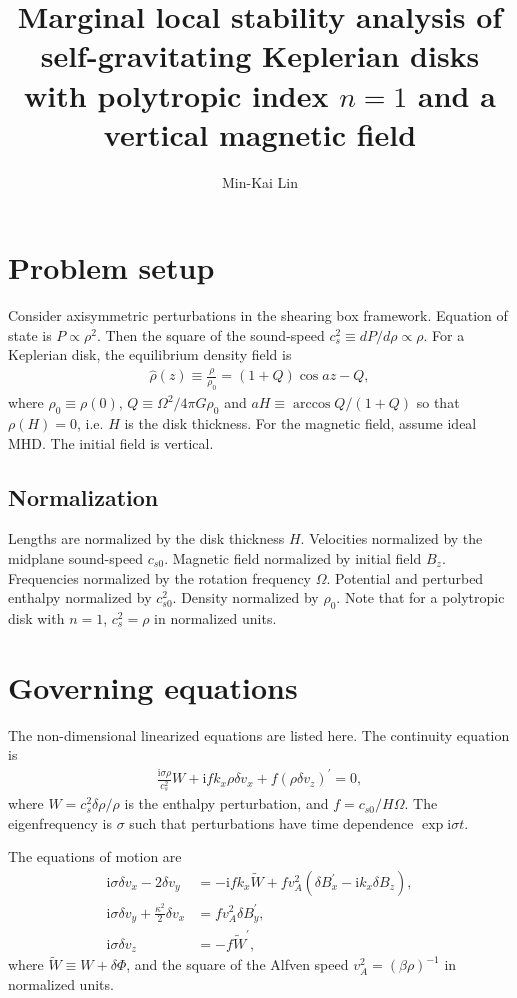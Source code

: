 \documentclass[12pt,preprint]{aastex}
\newcommand{\imgi}{\mathrm{i}}
\newcommand{\dd}{\delta}
\newcommand{\dvx}{\dd v_x}
\newcommand{\dvy}{\dd v_y}
\newcommand{\dvz}{\dd v_z}
\newcommand{\dbx}{\dd B_x}
\newcommand{\dby}{\dd B_y}
\newcommand{\dbz}{\dd B_z}
\newcommand{\w}{ \widetilde{W}}
\begin{document}
\title{Marginal local stability analysis of self-gravitating Keplerian
  disks with polytropic index $n=1$ and a vertical magnetic field}   


\author{Min-Kai Lin}

\section{Problem setup}
Consider axisymmetric perturbations in the shearing box
framework. Equation of state is $P\propto \rho^2$. Then the 
square of the sound-speed $c_s^2\equiv dP/d\rho \propto \rho$. For a
Keplerian disk, the equilibrium density field is
\begin{align}
\hat{\rho}(z)\equiv \frac{\rho}{\rho_0} = (1+Q)\cos{az} - Q, 
\end{align}
where $\rho_0\equiv\rho(0)$, $Q\equiv \Omega^2 / 4\pi G\rho_0$ and
$aH\equiv \arccos{Q/(1+Q)}$ so that $\rho(H) = 0$, i.e. $H$ is the
disk thickness. For the magnetic field, assume ideal 
MHD. The initial field is vertical.      

\subsection{Normalization}
Lengths are normalized by the disk thickness $H$. Velocities
normalized by the midplane sound-speed $c_{s0}$. Magnetic field
normalized by initial field $B_z$. Frequencies normalized by the
rotation frequency $\Omega$. Potential and perturbed enthalpy normalized by
$c_{s0}^2$. Density normalized by $\rho_0$. Note that for a polytropic
disk with $n=1$, $c_s^2=\rho$ in normalized 
units.  


\section{Governing equations}
The non-dimensional linearized equations are listed here. The
continuity equation is 
\begin{align}
  \frac{\imgi\sigma\rho}{c_s^2}W + \imgi  f k_x \rho \dvx +
  f\left(\rho\dvz\right)^\prime = 0, \label{cont}   
\end{align}
where $W = c_s^2\delta\rho/\rho$ is the enthalpy perturbation, and 
$f= c_{s0}/H\Omega$. The eigenfrequency is $\sigma$ such that
perturbations have time dependence $\exp{\imgi\sigma t}$. 


The equations of motion are
\begin{align}
  \imgi\sigma \dvx - 2 \dvy  &= - \imgi
  f k_x\w + fv_A^2 \left(\dbx^\prime - \imgi 
  k_x\dbz\right),\\
  \imgi\sigma\dvy + 
  \frac{\kappa^2}{2}\dvx &= fv_A^2\dby^\prime\label{lin_vy},\\ 
  \imgi\sigma\dvz & = -f \w^\prime\label{lin_vz}, 
\end{align}
where $\w \equiv W + \delta\Phi$, and the square of the Alfven speed
$v_A^2= (\beta\rho)^{-1}$ in normalized units. 
\end{document}
